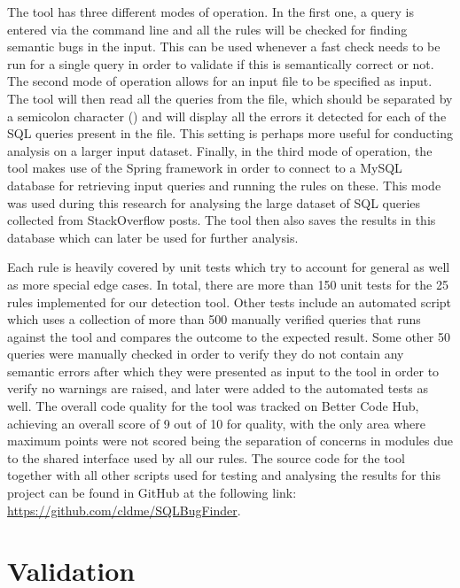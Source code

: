 The tool has three different modes of operation. In the first one, a query is entered via the command line and all the rules will be checked for finding semantic bugs in the input. This can be used whenever a fast check needs to be run for a single query in order to validate if this is semantically correct or not. The second mode of operation allows for an input file to be specified as input. The tool will then read all the queries from the file, which should be separated by a semicolon character (\sql{;}) and will display all the errors it detected for each of the SQL queries present in the file. This setting is perhaps more useful for conducting analysis on a larger input dataset. Finally, in the third mode of operation, the tool makes use of the Spring framework in order to connect to a MySQL database for retrieving input queries and running the rules on these. This mode was used during this research for analysing the large dataset of SQL queries collected from StackOverflow posts. The tool then also saves the results in this database which can later be used for further analysis.

Each rule is heavily covered by unit tests which try to account for general as well as more special edge cases. In total, there are more than 150 unit tests for the 25 rules implemented for our detection tool. Other tests include an automated script which uses a collection of more than 500 manually verified queries that runs against the tool and compares the outcome to the expected result. Some other 50 queries were manually checked in order to verify they do not contain any semantic errors after which they were presented as input to the tool in order to verify no warnings are raised, and later were added to the automated tests as well. The overall code quality for the tool was tracked on Better Code Hub, achieving an overall score of 9 out of 10 for quality, with the only area where maximum points were not scored being the separation of concerns in modules due to the shared interface used by all our rules. The source code for the tool together with all other scripts used for testing and analysing the results for this project can be found in GitHub at the following link: \url{https://github.com/cldme/SQLBugFinder}.


\section{Validation}
\label{section:validation}

